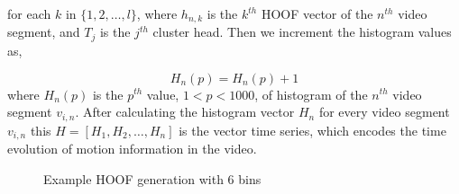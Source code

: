 for each $k$ in $\{1,2,\dots, l\}$, where $h_{n,k}$ is the $k^{th}$ HOOF vector of the $n^{th}$ video segment, and $T_{j}$ is the $j^{th}$ cluster head. Then we increment the histogram values as,

\begin{equation}
H_{n}(p) = H_{n}(p)+1
\end{equation}
where $H_{n}(p)$ is the $p^{th}$ value, $1<p<1000$, of histogram of the $n^{th}$ video segment $v_{i,n}$. After calculating the histogram vector $H_{n}$ for every video segment $v_{i,n}$
this $H = [H_{1},H_{2}, \dots, H_{n}]$ is the vector time series, which encodes the time evolution of motion information in the video.

\begin{figure}
  \centering
  
  \caption{Example HOOF generation with 6 bins}\label{fi:hoof}
\end{figure}
